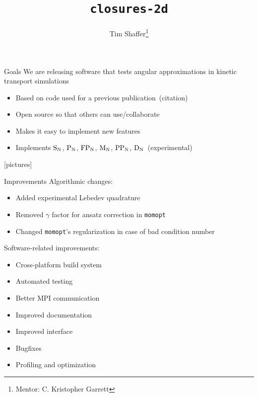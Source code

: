 \documentclass{beamer}
\title{\texttt{closures-2d}}
\author{Tim Shaffer\thanks{Mentor: C. Kristopher Garrett}}
\newcommand{\SN}{\ensuremath{\textnormal{S}_\textnormal{N}}\xspace}
\newcommand{\PN}{\ensuremath{\textnormal{P}_\textnormal{N}}\xspace}
\newcommand{\MN}{\ensuremath{\textnormal{M}_\textnormal{N}}\xspace}
\newcommand{\PPN}{\ensuremath{\textnormal{PP}_\textnormal{N}}\xspace}
\newcommand{\FPN}{\ensuremath{\textnormal{FP}_\textnormal{N}}\xspace}
\newcommand{\DN}{\ensuremath{\textnormal{D}_\textnormal{N}}\xspace}
\begin{document}
    \frame{\titlepage}

    \begin{frame}{Goals}
        We are releasing software that tests angular approximations in kinetic transport simulations
        \begin{itemize}
            \item Based on code used for a previous publication~(citation)
            \item Open source so that others can use/collaborate
            \item Makes it easy to implement new features
            \item Implements \SN, \PN, \FPN, \MN, \PPN, \DN~(experimental)
        \end{itemize}

        [pictures]
    \end{frame}

    \begin{frame}{Improvements}
        Algorithmic changes:
        \begin{itemize}
            \item Added experimental Lebedev quadrature
            \item Removed $\gamma$ factor for ansatz correction in \texttt{momopt}
            \item Changed \texttt{momopt}'s regularization in case of bad condition number
        \end{itemize}

        \vfill

        Software-related improvements:
        \begin{itemize}
            \item Cross-platform build system
            \item Automated testing
            \item Better MPI communication
            \item Improved documentation
            \item Improved interface
            \item Bugfixes
            \item Profiling and optimization
        \end{itemize}
    \end{frame}
\end{document}
